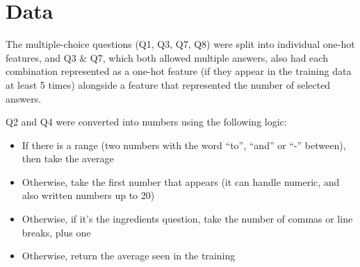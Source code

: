 \section{Data}






The multiple-choice questions (Q1, Q3, Q7, Q8) were split into individual one-hot features, and Q3 & Q7, which both allowed multiple answers, also had each combination represented as a one-hot feature (if they appear in the training data at least 5 times) alongside a feature that represented the number of selected answers.

Q2 and Q4 were converted into numbers using the following logic:
\begin{itemize}
    \item If there is a range (two numbers with the word “to”, “and” or “-” between), then take the average
    \item Otherwise, take the first number that appears (it can handle numeric, and also written numbers up to 20)
    \item Otherwise, if it’s the ingredients question, take the number of commas or line breaks, plus one
    \item Otherwise, return the average seen in the training
\end{itemize}


